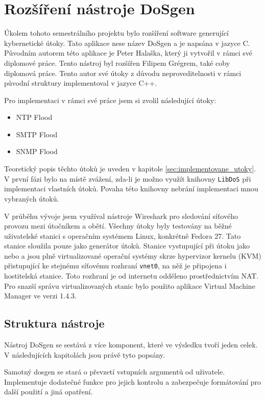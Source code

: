 \chapter{Rozšíření nástroje DoSgen}
Úkolem tohoto semestrálního projektu bylo rozšíření software generující kybernetické útoky. Tato aplikace nese název DoSgen a je napsána v jazyce C. Původním autorem této aplikace je Peter Halaška, který ji vytvořil v rámci své diplomové práce. Tento nástroj byl rozšířen Filipem Grégrem, také coby diplomová práce. Tento autor své útoky z důvodu neproveditelnosti v rámci původní struktury implementoval v jazyce C++.

Pro implementaci v rámci své práce jsem si zvolil následující útoky:
\begin{itemize}
	\item{NTP Flood}
	\item{SMTP Flood}
	\item{SNMP Flood}
\end{itemize}

Teoretický popis těchto útoků je uveden v kapitole \ref{sec:implementovane_utoky}. V první fázi bylo na místě zvážení, zda-li je možno využít knihovny \texttt{LibDoS} při implementaci vlastních útoků. Povaha této knihovny nebrání implementaci mnou vybraných útoků.

V průběhu vývoje jsem využíval nástroje Wireshark pro sledování síťového provozu mezi útočníkem a obětí. Všechny útoky byly testovány na běžné uživatelské stanici s operačním systémem Linux, konkrétně Fedora 27. Tato stanice sloužila pouze jako generátor útoků. Stanice vystupující při útoku jako  nebo  a  jsou plně virtualizované operační systémy skrze hypervizor kernelu (KVM) přistupující ke stejnému síťovému rozhraní \texttt{vnet0}, na něž je připojena i hostitelská stanice. Toto rozhraní je od internetu odděleno prostřednictvím NAT. Pro snazší správu virtualizovaných stanic bylo použito aplikace Virtual Machine Manager ve verzi 1.4.3.


\section{Struktura nástroje}
Nástroj DoSgen se sestává z více komponent, které ve výsledku tvoří jeden celek. V následujících kapitolách jsou právě tyto popsány.

Samotný dosgen se stará o převzetí vstupních argumentů od uživatele. Implementuje dodatečné funkce pro jejich kontrolu a zabezpečuje formátování pro další použití a jiná opatření.

